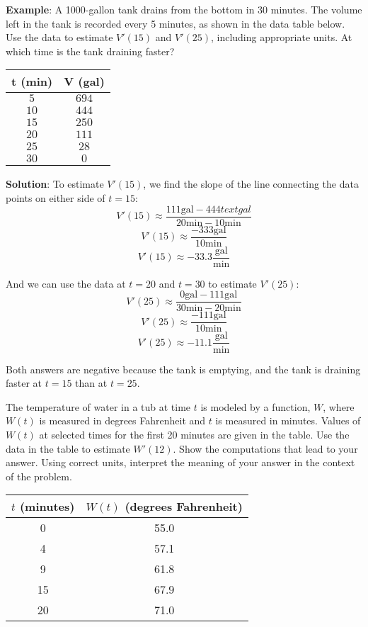 \textbf{Example}: A 1000-gallon tank drains from the bottom in 30 minutes. The 
volume left in the tank is recorded every 5 minutes, as shown in the data 
table below. Use the data to estimate $V'(15)$ and $V'(25)$, including 
appropriate units. At which time is the tank draining faster?

\begin{center}
\begin{tabular}{|c|c|}
\hline
t (min) & V (gal)\\\hline
$5$ & $694$\\\hline
$10$ & $444$\\\hline
$15$ & $250$\\\hline
$20$ & $111$\\\hline
$25$ & $28$\\\hline
$30$ & $0$\\\hline
\end{tabular}
\end{center}

\textbf{Solution}: To estimate $V'(15)$, we find the slope of the line 
connecting the data points on either side of $t = 15$:
$$V'(15) \approx \frac{111\text{gal} - 444text{gal}}{20\text{min} - 10
\text{min}}$$
$$V'(15) \approx \frac{-333\text{gal}}{10\text{min}}$$
$$V'(15) \approx -33.3 \frac{\text{gal}}{\text{min}}$$

And we can use the data at $t = 20$ and $t = 30$ to estimate $V'(25)$:
$$V'(25) \approx \frac{0\text{gal} - 111\text{gal}}{30\text{min} - 20
\text{min}}$$
$$V'(25) \approx \frac{-111\text{gal}}{10\text{min}}$$
$$V'(25) \approx -11.1 \frac{\text{gal}}{\text{min}}$$

Both answers are negative because the tank is emptying, and the tank is 
draining faster at $t = 15$ than at $t = 25$. 

\begin{Exercise} The temperature of water in a tub 
	at time $t$ is modeled by a function, $W$, where $W(t)$ is measured in degrees 
	Fahrenheit and $t$ is measured in minutes. Values of $W(t)$ at selected times 
	for the first 20 minutes are given in the table. Use the data in the table to 
	estimate $W'(12)$. Show the computations that lead to your answer. Using 
	correct units, interpret the meaning of your answer in the context of the 
	problem. \\
	\begin{tabular}{c|c}\hline
	$t$ (minutes) & $W(t)$ (degrees Fahrenheit)\\
	\hline
	0 & 55.0\\
	\hline
	4 & 57.1\\
	\hline
	9 & 61.8\\
	\hline
	15 & 67.9\\
	\hline
	20 & 71.0\\
	\hline
	\end{tabular}	 
\end{Exercise}

